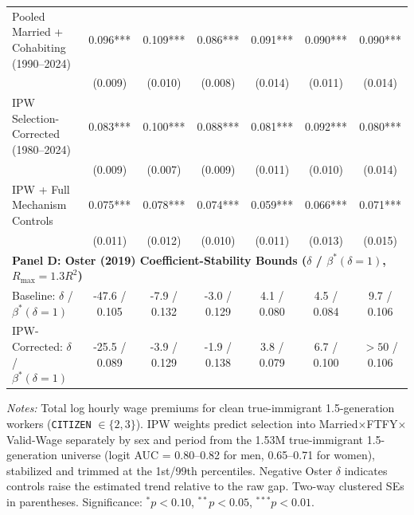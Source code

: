 \begin{table}[t!]
{\begin{tabular}{lcccccc}
Pooled Married + Cohabiting (1990--2024) & 0.096*** & 0.109*** & 0.086*** & 0.091*** & 0.090*** & 0.090*** \\
 & (0.009) & (0.010) & (0.008) & (0.014) & (0.011) & (0.014) \\
IPW Selection-Corrected (1980--2024) & 0.083*** & 0.100*** & 0.088*** & 0.081*** & 0.092*** & 0.080*** \\
 & (0.009) & (0.007) & (0.009) & (0.011) & (0.010) & (0.014) \\
IPW + Full Mechanism Controls & 0.075*** & 0.078*** & 0.074*** & 0.059*** & 0.066*** & 0.071*** \\
 & (0.011) & (0.012) & (0.010) & (0.011) & (0.013) & (0.015) \\
\midrule
\multicolumn{7}{l}{\textbf{Panel D: Oster (2019) Coefficient-Stability Bounds ($\delta$ / $\beta^*(\delta=1)$, $R_{\max}=1.3 R^2$)}} \\
Baseline: $\delta$ / $\beta^*(\delta=1)$ & -47.6 / 0.105 & -7.9 / 0.132 & -3.0 / 0.129 & 4.1 / 0.080 & 4.5 / 0.084 & 9.7 / 0.106 \\
IPW-Corrected: $\delta$ / $\beta^*(\delta=1)$ & -25.5 / 0.089 & -3.9 / 0.129 & -1.9 / 0.138 & 3.8 / 0.079 & 6.7 / 0.100 & $>50$ / 0.106 \\
\bottomrule
\end{tabular}%
}
\begin{minipage}{0.98\textwidth}\vspace{2pt}\scriptsize
\textit{Notes:} Total log hourly wage premiums for clean true-immigrant 1.5-generation workers (\texttt{CITIZEN} $\in \{2,3\}$). IPW weights predict selection into Married$\times$FTFY$\times$Valid-Wage separately by sex and period from the 1.53M true-immigrant 1.5-generation universe (logit AUC = 0.80--0.82 for men, 0.65--0.71 for women), stabilized and trimmed at the 1st/99th percentiles. Negative Oster $\delta$ indicates controls raise the estimated trend relative to the raw gap. Two-way clustered SEs in parentheses. Significance: $^{*} p<0.10$, $^{**} p<0.05$, $^{***} p<0.01$.
\end{minipage}
\end{table}